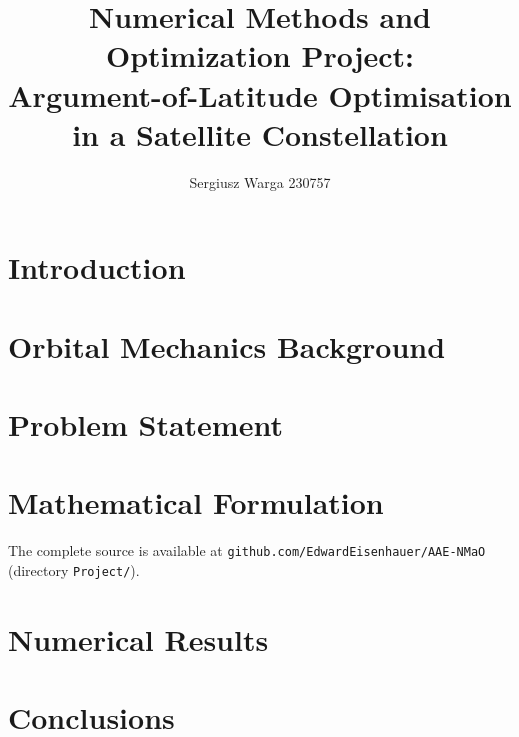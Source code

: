 \documentclass[a4paper]{article}
\title{Numerical Methods and Optimization Project:\\Argument-of-Latitude Optimisation\\in a Satellite Constellation}
\author{Sergiusz Warga 230757}
\date{}
\begin{document}
\maketitle
\tableofcontents
\pagebreak

\section{Introduction}


\section{Orbital Mechanics Background}


\section{Problem Statement}


\section{Mathematical Formulation}


The complete source is available at
\texttt{github.com/EdwardEisenhauer/AAE-NMaO} (directory \texttt{Project/}).

\section{Numerical Results}


\section{Conclusions}


\clearpage
\nocite{Bate1971, Vallado2013}


\end{document}
